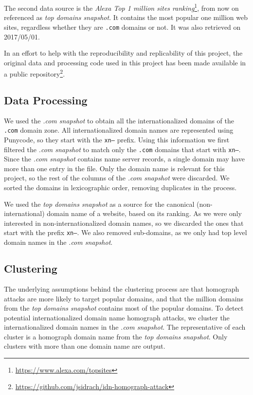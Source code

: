 \documentclass[letterpaper,twocolumn,10pt]{article}
\begin{document}
The second data source is the \textit{Alexa Top 1 million sites ranking}\footnote{\url{https://www.alexa.com/topsites}}, from now on referenced as \textit{top domains snapshot}.
It contains the most popular one million web sites, regardless whether they are \texttt{.com} domains or not.
It was also retrieved on 2017/05/01.

In an effort to help with the reproducibility and replicability of this project, the original data and processing code used in this project has been made available in a public repository\footnote{\url{https://github.com/jsidrach/idn-homograph-attack}}.

\subsection{Data Processing}
We used the \textit{.com snapshot} to obtain all the internationalized domains of the \texttt{.com} domain zone.
All internationalized domain names are represented using Punycode, so they start with the \texttt{xn--} prefix.
Using this information we first filtered the \textit{.com snapshot} to match only the \texttt{.com} domains that start with \texttt{xn--}.
Since the \textit{.com snapshot} contains name server records, a single domain may have more than one entry in the file.
Only the domain name is relevant for this project, so the rest of the columns of the \textit{.com snapshot} were discarded.
We sorted the domains in lexicographic order, removing duplicates in the process.

We used the \textit{top domains snapshot} as a source for the canonical (non-international) domain name of a website, based on its ranking.
As we were only interested in non-internationalized domain names, so we discarded the ones that start with the prefix \texttt{xn--}.
We also removed sub-domains, as we only had top level domain names in the \textit{.com snapshot}.

\subsection{Clustering}
The underlying assumptions behind the clustering process are that homograph attacks are more likely to target popular domains, and that the million domains from the \textit{top domains snapshot} contains most of the popular domains.
To detect potential internationalized domain name homograph attacks, we cluster the internationalized domain names in the \textit{.com snapshot}.
The representative of each cluster is a homograph domain name from the \textit{top domains snapshot}.
Only clusters with more than one domain name are output.
\end{document}

